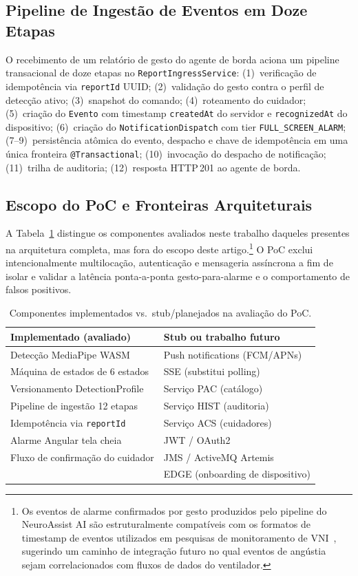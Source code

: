 \subsection{Pipeline de Ingestão de Eventos em Doze Etapas}
\label{sec:ingestao}

O recebimento de um relatório de gesto do agente de borda aciona um pipeline
transacional de doze etapas no \texttt{ReportIngressService}: (1)~verificação de
idempotência via \texttt{reportId} UUID; (2)~validação do gesto contra o perfil de
detecção ativo; (3)~snapshot do comando; (4)~roteamento do cuidador; (5)~criação do
\texttt{Evento} com timestamp \texttt{createdAt} do servidor e \texttt{recognizedAt}
do dispositivo; (6)~criação do \texttt{NotificationDispatch} com tier
\texttt{FULL\_SCREEN\_ALARM}; (7--9)~persistência atômica do evento, despacho e
chave de idempotência em uma única fronteira \texttt{@Transactional}; (10)~invocação
do despacho de notificação; (11)~trilha de auditoria; (12)~resposta HTTP\,201 ao
agente de borda.

\subsection{Escopo do PoC e Fronteiras Arquiteturais}
\label{sec:escopopoC}

A Tabela~\ref{tab:escopo} distingue os componentes avaliados neste trabalho daqueles
presentes na arquitetura completa, mas fora do escopo deste artigo.\footnote{Os eventos
de alarme confirmados por gesto produzidos pelo pipeline do NeuroAssist AI são
estruturalmente compatíveis com os formatos de timestamp de eventos utilizados em
pesquisas de monitoramento de VNI~\cite{stell2024pva, yang2026pva}, sugerindo um
caminho de integração futuro no qual eventos de angústia sejam correlacionados com
fluxos de dados do ventilador.} O PoC exclui intencionalmente multilocação,
autenticação e mensageria assíncrona a fim de isolar e validar a latência ponta-a-ponta
gesto-para-alarme e o comportamento de falsos positivos.

\begin{table}[htbp]
\centering
\caption{Componentes implementados vs.\ stub/planejados na avaliação do PoC.}
\label{tab:escopo}
\begin{tabular}{p{3.8cm}p{3.8cm}}
\toprule
\textbf{Implementado (avaliado)} & \textbf{Stub ou trabalho futuro} \\
\midrule
Detecção MediaPipe WASM & Push notifications (FCM/APNs) \\
Máquina de estados de 6 estados & SSE (substitui polling) \\
Versionamento DetectionProfile & Serviço PAC (catálogo) \\
Pipeline de ingestão 12 etapas & Serviço HIST (auditoria) \\
Idempotência via \texttt{reportId} & Serviço ACS (cuidadores) \\
Alarme Angular tela cheia & JWT / OAuth2 \\
Fluxo de confirmação do cuidador & JMS / ActiveMQ Artemis \\
                                 & EDGE (onboarding de dispositivo) \\
\bottomrule
\end{tabular}
\end{table}
